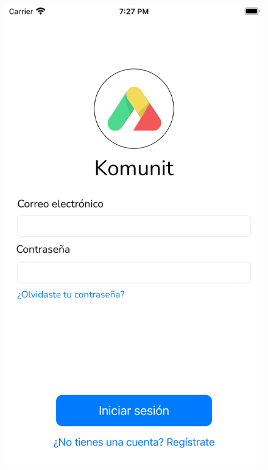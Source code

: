 \begin{appendices}
    \begin{figure}[H]
    \centering
    \begin{minipage}{0.3\textwidth}
        \centering
        \includegraphics[cframe=black 2pt, width=1\linewidth]{images/manual/login.png}
    \end{minipage}
    \begin{minipage}{0.3\textwidth}
        \centering

\end{minipage}
\end{figure}
\end{appendices}
